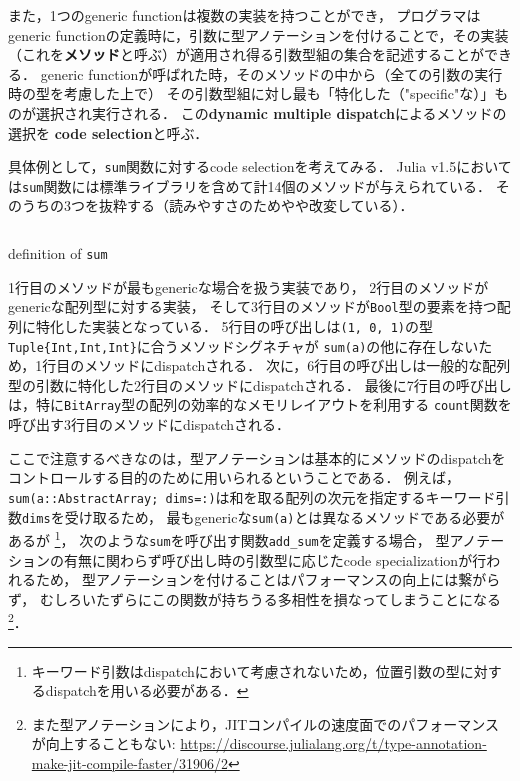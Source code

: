 また，1つのgeneric functionは複数の実装を持つことができ，
プログラマはgeneric functionの定義時に，引数に型アノテーションを付けることで，その実装
（これを\textbf{メソッド}と呼ぶ）が適用され得る引数型組の集合を記述することができる．
generic functionが呼ばれた時，そのメソッドの中から（全ての引数の実行時の型を考慮した上で）
その引数型組に対し最も「特化した（"specific"\footnotemark な）」ものが選択され実行される．
この\textbf{dynamic multiple dispatch}によるメソッドの選択を
\textbf{code selection}と呼ぶ．


具体例として，\verb|sum|関数に対するcode selectionを考えてみる．
Julia v1.5においては\verb|sum|関数には標準ライブラリを含めて計14個のメソッドが与えられている．
そのうちの3つを抜粋する（読みやすさのためやや改変している）．

\begin{listing}[ht]
  \inputminted[frame=lines, linenos]{julia}{src/sums_method.jl}
  \caption{definition of \texttt{sum}}
  \label{lst:sums}
\end{listing}

1行目のメソッドが最もgenericな場合を扱う実装であり，
2行目のメソッドがgenericな配列型に対する実装，
そして3行目のメソッドが\verb|Bool|型の要素を持つ配列に特化した実装となっている．
5行目の呼び出しは\verb|(1, 0, 1)|の型\verb|Tuple{Int,Int,Int}|に合うメソッドシグネチャが
\verb|sum(a)|の他に存在しないため，1行目のメソッドにdispatchされる．
次に，6行目の呼び出しは一般的な配列型の引数に特化した2行目のメソッドにdispatchされる．
最後に7行目の呼び出しは，特に\verb|BitArray|型の配列の効率的なメモリレイアウトを利用する
\verb|count|関数を呼び出す3行目のメソッドにdispatchされる．

ここで注意するべきなのは，型アノテーションは基本的にメソッドのdispatchをコントロールする目的のために用いられるということである．
例えば，\verb|sum(a::AbstractArray; dims=:)|は和を取る配列の次元を指定するキーワード引数\verb|dims|を受け取るため，
最もgenericな\verb|sum(a)|とは異なるメソッドである必要があるが
\footnote{
  キーワード引数はdispatchにおいて考慮されないため，位置引数の型に対するdispatchを用いる必要がある．
}，
次のような\verb|sum|を呼び出す関数\verb|add_sum|を定義する場合，
型アノテーションの有無に関わらず呼び出し時の引数型に応じたcode specializationが行われるため，
型アノテーションを付けることはパフォーマンスの向上には繋がらず，
むしろいたずらにこの関数が持ちうる多相性を損なってしまうことになる
\footnote{
  また型アノテーションにより，JITコンパイルの速度面でのパフォーマンスが向上することもない:
  \url{https://discourse.julialang.org/t/type-annotation-make-jit-compile-faster/31906/2}
}．

